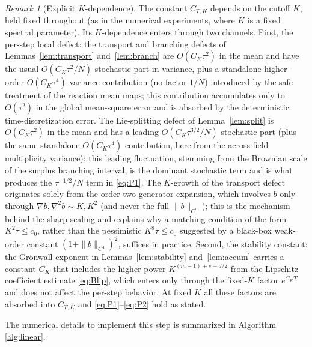 \documentclass[a4paper,fleqn]{cas-sc}
\theoremstyle{definition}
\theoremstyle{remark}
\newtheorem{remark}[theorem]{Remark}
\begin{document}
\begin{remark}[Explicit $K$-dependence]\label{rem:K-scaling}
The constant $C_{T,K}$ depends on the cutoff $K$, held fixed throughout (as in the
numerical experiments, where $K$ is a fixed spectral parameter). Its
$K$-dependence enters through two channels. First, the per-step local defect: the
transport and branching defects of Lemmas~\ref{lem:transport}
and~\ref{lem:branch} are $O(C_K\tau^2)$ in the mean and have the usual
$O(C_K\tau^2/N)$ stochastic part in variance, plus a standalone higher-order
$O(C_K\tau^4)$ variance contribution (no factor $1/N$) introduced by the safe
treatment of the reaction mean maps; this contribution accumulates only to
$O(\tau^2)$ in the global mean-square error and is absorbed by the deterministic
time-discretization error. The Lie-splitting defect of Lemma~\ref{lem:split} is
$O(C_K\tau^2)$ in the mean and has a leading $O(C_K\tau^{3/2}/N)$ stochastic part (plus
the same standalone $O(C_K\tau^4)$ contribution, here from the across-field
multiplicity variance); this leading
fluctuation, stemming from the Brownian scale of the surplus branching interval,
is the dominant stochastic term and is what produces the $\tau^{-1/2}/N$ term in \eqref{eq:P1}. The $K$-growth of the transport defect originates solely from the
order-two generator expansion, which involves $b$ only through $\nabla b,\nabla^2b
\sim K,K^2$ (and never the full $\|b\|_{C^m}$); this is the mechanism behind the
sharp scaling and explains why a matching condition of the form $K^2\tau\le c_0$,
rather than the pessimistic $K^8\tau\le c_0$ suggested by a black-box weak-order
constant $(1+\|b\|_{C^4})^2$, suffices in practice. Second, the stability constant:
the Gr\"onwall exponent in Lemmas~\ref{lem:stability} and~\ref{lem:accum} carries a
constant $C_K$ that includes the higher power $K^{(m-1)+s+d/2}$ from the Lipschitz
coefficient estimate \eqref{eq:Blip}, which enters only through the fixed-$K$
factor $e^{C_K T}$ and does not affect the per-step behavior. At fixed $K$ all
these factors are absorbed into $C_{T,K}$ and \eqref{eq:P1}--\eqref{eq:P2} hold as
stated.
\end{remark}

The numerical details to implement this step is summarized in Algorithm \ref{alg:linear}.
\end{document}
